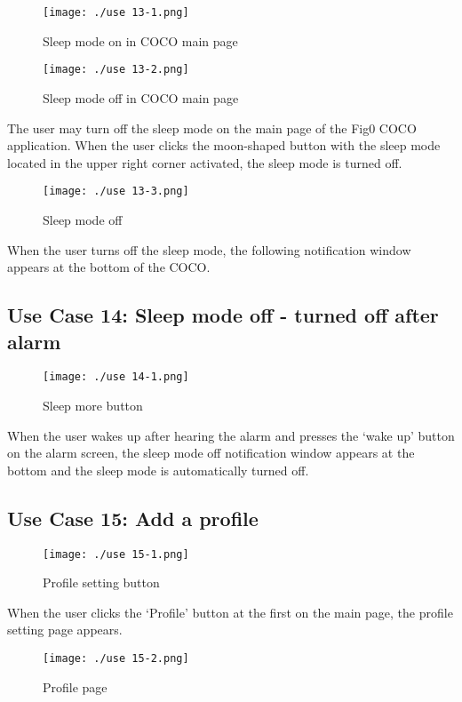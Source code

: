 \documentclass[conference]{IEEEtran}
\begin{document}
\begin{figure}[H]
\texttt{[image: ./use 13-1.png]}
\centering
\caption{Sleep mode on in COCO main page}
\end{figure}

\begin{figure}[H]
\texttt{[image: ./use 13-2.png]}
\centering
\caption{Sleep mode off in COCO main page}
\end{figure}

The user may turn off the sleep mode on the main page of the Fig0 COCO application. When the user clicks the moon-shaped button with the sleep mode located in the upper right corner activated, the sleep mode is turned off.

\begin{figure}[H]
\texttt{[image: ./use 13-3.png]}
\centering
\caption{Sleep mode off}
\end{figure}

When the user turns off the sleep mode, the following notification window appears at the bottom of the COCO.

\subsection{Use Case 14: Sleep mode off - turned off after alarm}

\begin{figure}[H]
\texttt{[image: ./use 14-1.png]}
\centering
\caption{Sleep more button}
\end{figure}

When the user wakes up after hearing the alarm and presses the ‘wake up' button on the alarm screen, the sleep mode off notification window appears at the bottom and the sleep mode is automatically turned off.

\subsection{Use Case 15: Add a profile}

\begin{figure}[H]
\texttt{[image: ./use 15-1.png]}
\centering
\caption{Profile setting button}
\end{figure}

When the user clicks the ‘Profile' button at the first on the main page, the profile setting page appears.

\begin{figure}[H]
\texttt{[image: ./use 15-2.png]}
\centering
\caption{Profile page}
\end{figure}
\end{document}
